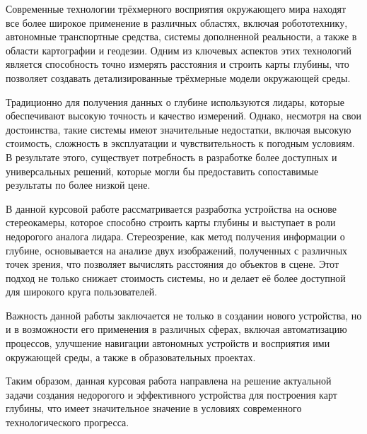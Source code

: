 
Современные технологии трёхмерного восприятия окружающего мира находят все более широкое применение в различных областях, включая робототехнику, автономные транспортные средства, системы дополненной реальности, а также в области картографии и геодезии. Одним из ключевых аспектов этих технологий является способность точно измерять расстояния и строить карты глубины, что позволяет создавать детализированные трёхмерные модели окружающей среды.

Традиционно для получения данных о глубине используются лидары, которые обеспечивают высокую точность и качество измерений. Однако, несмотря на свои достоинства, такие системы имеют значительные недостатки, включая высокую стоимость, сложность в эксплуатации и чувствительность к погодным условиям. В результате этого, существует потребность в разработке более доступных и универсальных решений, которые могли бы предоставить сопоставимые результаты по более низкой цене.

В данной курсовой работе рассматривается разработка устройства на основе стереокамеры, которое способно строить карты глубины и выступает в роли недорогого аналога лидара. Стереозрение, как метод получения информации о глубине, основывается на анализе двух изображений, полученных с различных точек зрения, что позволяет вычислять расстояния до объектов в сцене. Этот подход не только снижает стоимость системы, но и делает её более доступной для широкого круга пользователей.

Важность данной работы заключается не только в создании нового устройства, но и в возможности его применения в различных сферах, включая автоматизацию процессов, улучшение навигации автономных устройств и восприятия ими окружающей среды, а также в образовательных проектах.

Таким образом, данная курсовая работа направлена на решение актуальной задачи создания недорогого и эффективного устройства для построения карт глубины, что имеет значительное значение в условиях современного технологического прогресса.
